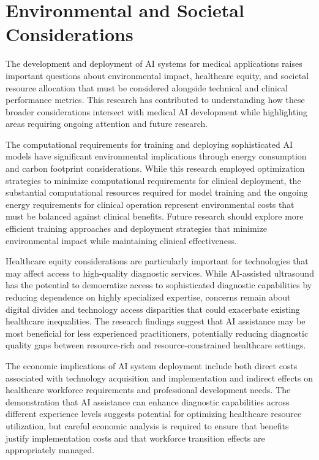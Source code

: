 \section{Environmental and Societal Considerations}

The development and deployment of AI systems for medical applications raises important questions about environmental impact, healthcare equity, and societal resource allocation that must be considered alongside technical and clinical performance metrics. This research has contributed to understanding how these broader considerations intersect with medical AI development while highlighting areas requiring ongoing attention and future research.

The computational requirements for training and deploying sophisticated AI models have significant environmental implications through energy consumption and carbon footprint considerations. While this research employed optimization strategies to minimize computational requirements for clinical deployment, the substantial computational resources required for model training and the ongoing energy requirements for clinical operation represent environmental costs that must be balanced against clinical benefits. Future research should explore more efficient training approaches and deployment strategies that minimize environmental impact while maintaining clinical effectiveness.

Healthcare equity considerations are particularly important for technologies that may affect access to high-quality diagnostic services. While AI-assisted ultrasound has the potential to democratize access to sophisticated diagnostic capabilities by reducing dependence on highly specialized expertise, concerns remain about digital divides and technology access disparities that could exacerbate existing healthcare inequalities. The research findings suggest that AI assistance may be most beneficial for less experienced practitioners, potentially reducing diagnostic quality gaps between resource-rich and resource-constrained healthcare settings.

The economic implications of AI system deployment include both direct costs associated with technology acquisition and implementation and indirect effects on healthcare workforce requirements and professional development needs. The demonstration that AI assistance can enhance diagnostic capabilities across different experience levels suggests potential for optimizing healthcare resource utilization, but careful economic analysis is required to ensure that benefits justify implementation costs and that workforce transition effects are appropriately managed.

